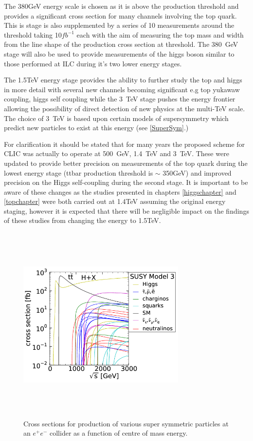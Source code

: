 The 380GeV energy scale is chosen as it is above the \ttbar production threshold and provides a significant cross section for many channels involving the top quark. This is stage is also supplemented by a series of 10 measurements around the \ttbar threshold taking 10${fb^{-1}}$ each with the aim of measuring the top mass and width from the line shape of the \ttbar production cross section at threshold. The 380~GeV stage will also be used to provide measurements of the higgs boson similar to those performed at \ac{ILC} during it's two lower energy stages.

The 1.5TeV energy stage provides the ability to further study the top and higgs in more detail with several new channels becoming significant e.g top yukawaw coupling, higgs self coupling while the 3~TeV stage pushes the energy frontier allowing the possibility of direct detection of new physics at the multi-TeV scale. The choice of 3~TeV is based upon certain models of supersymmetry which predict new particles to exist at this energy (see \ref{SuperSym}.)

For clarification it should be stated that for many years the proposed scheme for CLIC was actually to operate at 500~GeV, 1.4~TeV and 3~TeV. These were updated to provide better precision on measurements of the top quark during the lowest energy stage (\ac{ttbar} production threshold is $\sim$ 350GeV) and improved precision on the Higgs self-coupling during the second stage. It is important to be aware of these changes as the studies presented in chapters \ref{higgschapter} and \ref{topchapter} were both carried out at 1.4TeV assuming the original energy staging, however it is expected that there will be negligible impact on the findings of these studies from changing the energy to 1.5TeV.  

\begin{figure}
  \centering
  \includegraphics[width=0.75\textwidth,height=10cm,keepaspectratio]{Experiments/fig/clicSS}
  \caption[Cross Sections For Super Symmetric Processes]{Cross sections for production of various super symmetric particles at an ${e^+e^-}$ collider as a function of centre of mass energy.}
  \label{Fig:SuperSym}
\end{figure}

